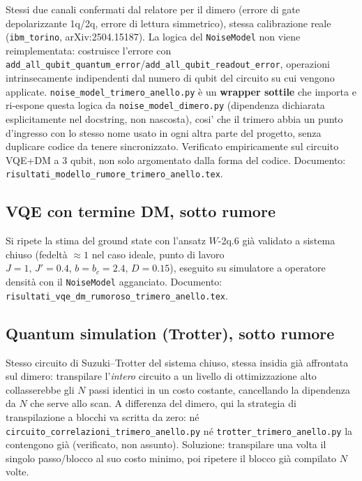\documentclass[11pt,a4paper]{article}
\begin{document}
Stessi due canali confermati dal relatore per il dimero (errore di gate
depolarizzante 1q/2q, errore di lettura simmetrico), stessa calibrazione
reale (\texttt{ibm\_torino}, arXiv:2504.15187). La logica del
\texttt{NoiseModel} non viene reimplementata: costruisce l'errore con
\texttt{add\_all\_qubit\_\allowbreak quantum\_error}/\texttt{add\_all\_qubit\_\allowbreak readout\_error},
operazioni intrinsecamente indipendenti dal numero di qubit del circuito
su cui vengono applicate. \texttt{noise\_model\_\allowbreak trimero\_anello.py} è un
\textbf{wrapper sottile} che importa e ri-espone questa logica da
\texttt{noise\_model\_dimero.py} (dipendenza dichiarata esplicitamente
nel docstring, non nascosta), cosi' che il trimero abbia un punto
d'ingresso con lo stesso nome usato in ogni altra parte del progetto,
senza duplicare codice da tenere sincronizzato. Verificato empiricamente
sul circuito VQE+DM a 3 qubit, non solo argomentato dalla forma del
codice. Documento:
\texttt{risultati\_\allowbreak modello\_rumore\_\allowbreak trimero\_anello.tex}.

\subsection{VQE con termine DM, sotto rumore}

Si ripete la stima del ground state con l'ansatz $W$-2q.6 già validato a
sistema chiuso (fedeltà $\approx1$ nel caso ideale, punto di lavoro
$J=1,\,J'=0.4,\,b=b_c=2.4,\,D=0.15$), eseguito su simulatore a operatore
densità con il \texttt{NoiseModel} agganciato. Documento:
\texttt{risultati\_vqe\_dm\_\allowbreak rumoroso\_trimero\_anello.tex}.

\subsection{Quantum simulation (Trotter), sotto rumore}
\label{subsec:trotter}

Stesso circuito di Suzuki--Trotter del sistema chiuso, stessa insidia
già affrontata sul dimero: transpilare l'\emph{intero} circuito a un
livello di ottimizzazione alto collasserebbe gli $N$ passi identici in
un costo costante, cancellando la dipendenza da $N$ che serve allo scan.
A differenza del dimero, qui la strategia di transpilazione a blocchi
va scritta da zero: né
\texttt{circuito\_\allowbreak correlazioni\_\allowbreak trimero\_anello.py}
né \texttt{trotter\_trimero\_anello.py} la contengono già (verificato,
non assunto). Soluzione: transpilare una volta il singolo passo/blocco
al suo costo minimo, poi ripetere il blocco già compilato $N$ volte.
\end{document}
